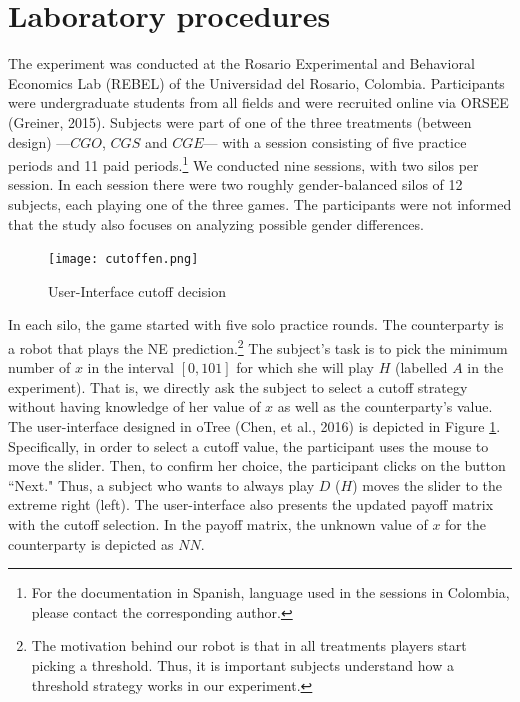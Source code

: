 \documentclass[11pt, letterpaper]{article}
\theoremstyle{plain}
\begin{document}
\section{Laboratory procedures}
\label{sec:game}

The experiment was conducted at the Rosario Experimental and Behavioral Economics Lab (REBEL) of the Universidad del Rosario, Colombia. Participants were undergraduate students from all fields and were recruited online via ORSEE (Greiner, 2015). Subjects were part of one of the three treatments (between design) ---$CGO$, $CGS$ and $CGE$---  with  a session consisting of five practice periods and 11 paid periods.\footnote{For the documentation in Spanish, language used in the sessions in Colombia, please contact the corresponding author.} We conducted nine sessions, with two silos per session. In each session there were two roughly gender-balanced silos of 12 subjects, each playing one of the three games. The participants were not informed that the study also focuses on analyzing possible gender differences.

\begin{center}
\begin{figure}[ht]
\centering{}%
\texttt{[image: cutoffen.png]}%
\caption{User-Interface cutoff decision} 
\label{fig:ui}
\end{figure}
\end{center}
In each silo, the game started with five solo practice rounds. The counterparty is a robot that plays the NE prediction.\footnote{The motivation behind our robot is that in all treatments players start picking a threshold. Thus, it is important subjects understand how a threshold strategy works in our experiment.} The subject's task is to pick the minimum number of $x$ in the interval $[0,101]$ for which she will play $H$ (labelled $A$ in the experiment). That is, we directly ask the subject to select a cutoff strategy without having knowledge of her value of $x$ as well as the counterparty's value. The user-interface designed in oTree (Chen, et al., 2016) is depicted in Figure \ref{fig:ui}. Specifically, in order to select a cutoff value, the participant uses the mouse to move the slider. Then, to confirm her choice, the participant clicks on the button ``Next." Thus, a subject who wants to always play $D$ ($H$)  moves the slider to the extreme right (left). The user-interface also presents the updated payoff matrix with the cutoff selection. In the payoff matrix, the unknown value of $x$ for the counterparty is depicted as $NN$.
\end{document}
